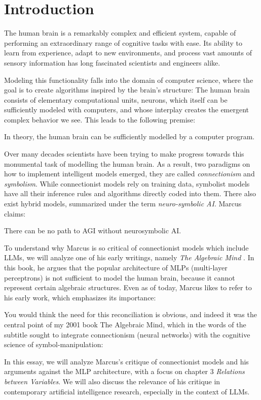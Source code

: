 \documentclass[../../main.tex]{subfiles}
\begin{document}
    \chapter{Introduction}
    The human brain is a remarkably complex and efficient system, capable of performing an extraordinary range of cognitive tasks with ease. Its ability to learn from experience, adapt to new environments, and process vast amounts of sensory information has long fascinated scientists and engineers alike.

    Modeling this functionality falls into the domain of computer science, where the goal is to create algorithms inspired by the brain's structure: The human brain consists of elementary computational units, neurons, which itself can be sufficiently modeled with computers, and whose interplay creates the emergent complex behavior we see. This leads to the following premise:

    \begin{premise}
        In theory, the human brain can be sufficiently modelled by a computer program.
    \end{premise}

    Over many decades scientists have been trying to make progress towards this monumental task of modelling the human brain. As a result, two paradigms on how to implement intelligent models emerged, they are called \emph{connectionism} and \emph{symbolism}. While connectionist models rely on training data, symbolist models have all their inference rules and algorithms directly coded into them. There also exist hybrid models, summarized under the term \emph{neuro-symbolic AI}. Marcus claims:

    \begin{citecallout}
        There can be no path to AGI without neurosymbolic AI.
    \end{citecallout}

    To understand why Marcus is so critical of connectionist models which include LLMs, we will analyze one of his early writings, namely \emph{The Algebraic Mind} \cite{marcus_algebraic_mind}. In this book, he argues that the popular architecture of MLPs (multi-layer perceptrons) is not sufficient to model the human brain, because it cannot represent certain algebraic structures. Even as of today, Marcus likes to refer to his early work, which emphasizes its importance:

    \begin{citecallout}
        You would think the need for this reconciliation is obvious, and indeed it was the central point of my 2001 book The Algebraic Mind, which in the words of the subtitle sought to integrate connectionism (neural networks) with the cognitive science of symbol-manipulation:
    \end{citecallout}

    In this essay, we will analyze Marcus's critique of connectionist models and his arguments against the MLP architecture, with a focus on chapter 3 \textit{Relations between Variables}. We will also discuss the relevance of his critique in contemporary artificial intelligence research, especially in the context of LLMs.  
\end{document}
